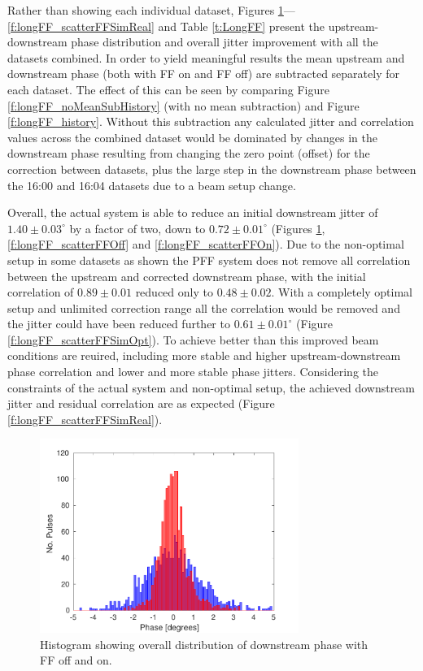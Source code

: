 Rather than showing each individual dataset, Figures 
\ref{f:longFF_histDownstreamPhase}---\ref{f:longFF_scatterFFSimReal} and Table 
\ref{t:LongFF} present the upstream-downstream phase distribution and overall jitter 
improvement with all the datasets combined. In order to yield meaningful results the 
mean upstream and downstream phase (both with FF on and FF off) are subtracted 
separately for each dataset. The effect of this can be seen by comparing Figure 
\ref{f:longFF_noMeanSubHistory} (with no mean subtraction) and Figure 
\ref{f:longFF_history}. Without this subtraction any calculated jitter and correlation 
values across the combined dataset would be dominated by changes in the downstream phase resulting from changing the zero point (offset) for the correction between datasets, 
plus the large step in the downstream phase between the 16:00 and 16:04 datasets due to 
a beam setup change. 



Overall, the actual system is able to reduce an initial downstream jitter of 
\(1.40\pm0.03^\circ\) by a factor of two, down to \(0.72\pm0.01^\circ\) (Figures 
\ref{f:longFF_histDownstreamPhase}, \ref{f:longFF_scatterFFOff} and 
\ref{f:longFF_scatterFFOn}). Due to the non-optimal setup in some datasets as shown the 
PFF system does not remove all correlation between the upstream and corrected downstream phase, with the initial correlation of \(0.89\pm0.01\) reduced only to \(0.48\pm0.02\). 
With a completely optimal setup and unlimited correction range all the correlation would be removed and the jitter could have been reduced further to \(0.61\pm0.01^\circ\) 
(Figure \ref{f:longFF_scatterFFSimOpt}). To achieve better than this improved beam 
conditions are reuired, including more stable and higher upstream-downstream phase 
correlation and lower and more stable phase jitters. Considering the constraints of the 
actual system and non-optimal setup, the achieved downstream jitter and residual 
correlation are as expected (Figure \ref{f:longFF_scatterFFSimReal}).



\begin{figure}
  \centering
  \includegraphics[width=0.75\textwidth]{Figures/feedforward/longFF_histDownstreamPhase}
  \caption{Histogram showing overall distribution of downstream phase with FF off and on.}
  \label{f:longFF_histDownstreamPhase}
\end{figure}

